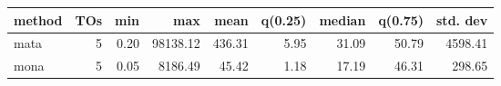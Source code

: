 \begin{tabular}{lrrrrrrrr}
\hline
 method   &   TOs &   min &      max &   mean &   q(0.25) &   median &   q(0.75) &   std. dev \\
\hline
 mata     &  5 &  0.20 & 98138.12 & 436.31 &      5.95 &    31.09 &     50.79 &    4598.41 \\
 mona     &  5 &  0.05 &  8186.49 &  45.42 &      1.18 &    17.19 &     46.31 &     298.65 \\
\hline
\end{tabular}
